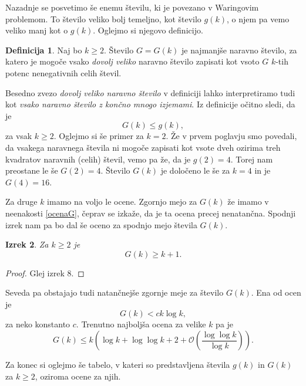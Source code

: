\documentclass[a4paper]{amsart}
\theoremstyle{definition}
\newtheorem{definicija}{Definicija}[section]
\theoremstyle{plain}
\newtheorem{izrek}[definicija]{Izrek}
\numberwithin{equation}{section}
\begin{document}
Nazadnje se posvetimo še enemu številu, ki je povezano v Waringovim problemom. To število veliko bolj temeljno, kot število $g(k)$, o njem pa vemo veliko manj kot o $g(k)$. Oglejmo si njegovo definicijo.

\begin{definicija}
	Naj bo $k\geqslant 2$. Število $G=G(k)$ je najmanjše naravno število, za katero je mogoče vsako \emph{dovolj veliko} naravno število zapisati kot vsoto $G$ $k$-tih potenc nenegativnih celih števil.
\end{definicija}

Besedno zvezo \emph{dovolj veliko naravno število} v definiciji lahko interpretiramo tudi kot \emph{vsako naravno število z končno mnogo izjemami}. Iz definicije očitno sledi, da je \begin{equation}\label{ocenaG}
	G(k)\leqslant g(k), \tag{$\triangle$}
\end{equation} za vsak $k\geqslant 2$. Oglejmo si še primer za $k=2$. Že v prvem poglavju smo povedali, da vsakega naravnega števila ni mogoče zapisati kot vsote dveh ozirima treh kvadratov naravnih (celih) števil, vemo pa že, da je $g(2)=4$. Torej nam preostane le še $G(2)=4$. Število $G(k)$ je določeno le še za $k=4$ in je $G(4)=16$. 

Za druge $k$ imamo na voljo le ocene. Zgornjo mejo za $G(k)$ že imamo v neenakosti \ref{ocenaG}, čeprav se izkaže, da je ta ocena precej nenatančna. Spodnji izrek nam pa bo dal še oceno za spodnjo mejo števila $G(k)$.

\begin{izrek}
	Za $k\geqslant 2$ je $$G(k)\geqslant k+1.$$
\end{izrek}

\begin{proof}
	Glej \cite{Lalin} izrek 8.
\end{proof}

Seveda pa obstajajo tudi natančnejše zgornje meje za število $G(k)$. Ena od ocen je 
$$G(k) <ck\log k,$$ za neko konstanto $c$. Trenutno najboljša ocena za velike $k$ pa je $$G(k) \leqslant k\left(\log k + \log\log k + 2 + \mathcal{O}\left(\frac{\log\log k}{\log k}\right)\right).$$

Za konec si oglejmo še tabelo, v kateri so predstavljena števila $g(k)$ in $G(k)$ za $k\geqslant 2$, oziroma ocene za njih.
\end{document}
